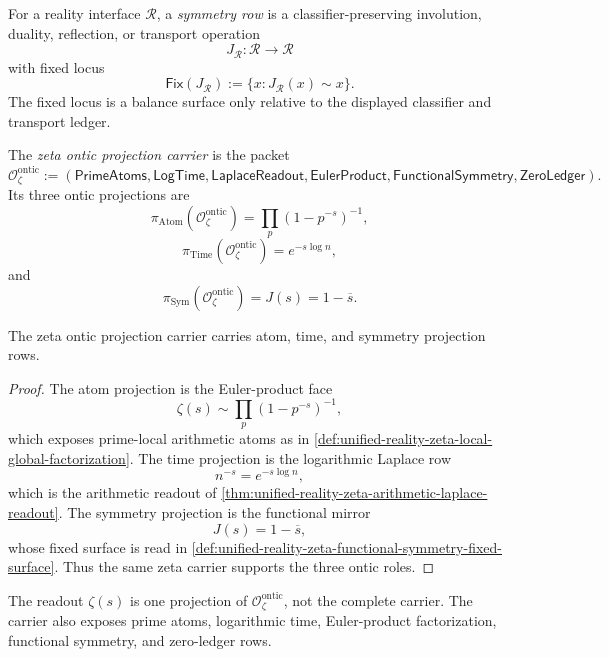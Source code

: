 \begin{definition}
\label{def:unified-reality-ontic-symmetry-row}
For a reality interface $\mathcal R$, a \emph{symmetry row} is a
classifier-preserving involution, duality, reflection, or transport
operation
$$
J_{\mathcal R}:\mathcal R\to\mathcal R
$$
with fixed locus
$$
\mathsf{Fix}(J_{\mathcal R})
:=
\{x:J_{\mathcal R}(x)\sim x\}.
$$
The fixed locus is a balance surface only relative to the displayed
classifier and transport ledger.
\end{definition}

\begin{definition}
\label{def:unified-reality-zeta-ontic-projection-carrier}
The \emph{zeta ontic projection carrier} is the packet
$$
\mathcal O_{\zeta}^{\mathrm{ontic}}
:=
(
\mathsf{PrimeAtoms},
\mathsf{LogTime},
\mathsf{LaplaceReadout},
\mathsf{EulerProduct},
\mathsf{FunctionalSymmetry},
\mathsf{ZeroLedger}
).
$$
Its three ontic projections are
$$
\pi_{\mathrm{Atom}}(\mathcal O_{\zeta}^{\mathrm{ontic}})
=
\prod_p(1-p^{-s})^{-1},
$$
$$
\pi_{\mathrm{Time}}(\mathcal O_{\zeta}^{\mathrm{ontic}})
=
e^{-s\log n},
$$
and
$$
\pi_{\mathrm{Sym}}(\mathcal O_{\zeta}^{\mathrm{ontic}})
=
J(s)=1-\overline{s}.
$$
\end{definition}

\begin{theorem}
\label{thm:unified-reality-zeta-carries-ontic-triple}
The zeta ontic projection carrier carries atom, time, and symmetry
projection rows.
\end{theorem}

\begin{proof}
The atom projection is the Euler-product face
$$
\zeta(s)\sim\prod_p(1-p^{-s})^{-1},
$$
which exposes prime-local arithmetic atoms as in
\autoref{def:unified-reality-zeta-local-global-factorization}. The time
projection is the logarithmic Laplace row
$$
n^{-s}=e^{-s\log n},
$$
which is the arithmetic readout of
\autoref{thm:unified-reality-zeta-arithmetic-laplace-readout}. The
symmetry projection is the functional mirror
$$
J(s)=1-\overline{s},
$$
whose fixed surface is read in
\autoref{def:unified-reality-zeta-functional-symmetry-fixed-surface}.
Thus the same zeta carrier supports the three ontic roles.
\end{proof}

\begin{corollary}
\label{cor:unified-reality-zeta-not-only-value-function}
The readout $\zeta(s)$ is one projection of
$\mathcal O_{\zeta}^{\mathrm{ontic}}$, not the complete carrier. The
carrier also exposes prime atoms, logarithmic time, Euler-product
factorization, functional symmetry, and zero-ledger rows.
\end{corollary}

